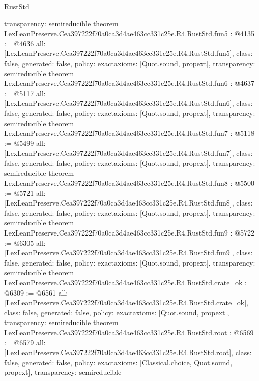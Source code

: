 \begin{lexlean}{RustStd}
\begin{coremodule}
{  transparency: semireducible
}
theorem LexLeanPreserve.Cea397222f70a0ca3d4ae463cc331c25e.R4.RustStd.fun5 : @4135 := @4636 {
  all: [LexLeanPreserve.Cea397222f70a0ca3d4ae463cc331c25e.R4.RustStd.fun5],
  class: false,
  generated: false,
  policy: exact{axioms: [Quot.sound, propext]},
  transparency: semireducible
}
theorem LexLeanPreserve.Cea397222f70a0ca3d4ae463cc331c25e.R4.RustStd.fun6 : @4637 := @5117 {
  all: [LexLeanPreserve.Cea397222f70a0ca3d4ae463cc331c25e.R4.RustStd.fun6],
  class: false,
  generated: false,
  policy: exact{axioms: [Quot.sound, propext]},
  transparency: semireducible
}
theorem LexLeanPreserve.Cea397222f70a0ca3d4ae463cc331c25e.R4.RustStd.fun7 : @5118 := @5499 {
  all: [LexLeanPreserve.Cea397222f70a0ca3d4ae463cc331c25e.R4.RustStd.fun7],
  class: false,
  generated: false,
  policy: exact{axioms: [Quot.sound, propext]},
  transparency: semireducible
}
theorem LexLeanPreserve.Cea397222f70a0ca3d4ae463cc331c25e.R4.RustStd.fun8 : @5500 := @5721 {
  all: [LexLeanPreserve.Cea397222f70a0ca3d4ae463cc331c25e.R4.RustStd.fun8],
  class: false,
  generated: false,
  policy: exact{axioms: [Quot.sound, propext]},
  transparency: semireducible
}
theorem LexLeanPreserve.Cea397222f70a0ca3d4ae463cc331c25e.R4.RustStd.fun9 : @5722 := @6305 {
  all: [LexLeanPreserve.Cea397222f70a0ca3d4ae463cc331c25e.R4.RustStd.fun9],
  class: false,
  generated: false,
  policy: exact{axioms: [Quot.sound, propext]},
  transparency: semireducible
}
theorem LexLeanPreserve.Cea397222f70a0ca3d4ae463cc331c25e.R4.RustStd.crate_ok : @6309 := @6561 {
  all: [LexLeanPreserve.Cea397222f70a0ca3d4ae463cc331c25e.R4.RustStd.crate_ok],
  class: false,
  generated: false,
  policy: exact{axioms: [Quot.sound, propext]},
  transparency: semireducible
}
theorem LexLeanPreserve.Cea397222f70a0ca3d4ae463cc331c25e.R4.RustStd.root : @6569 := @6579 {
  all: [LexLeanPreserve.Cea397222f70a0ca3d4ae463cc331c25e.R4.RustStd.root],
  class: false,
  generated: false,
  policy: exact{axioms: [Classical.choice, Quot.sound, propext]},
  transparency: semireducible
}


\end{coremodule}
\end{lexlean}
